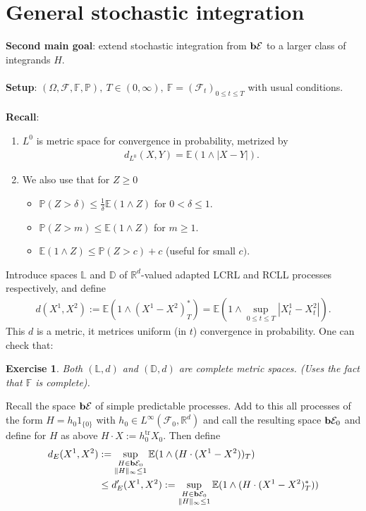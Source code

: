 \documentclass[12pt,a4paper, twoside]{article}
\newtheorem{exe}{Exercise}[section]
\theoremstyle{definition}
\newcommand{\EE}{\mathbb{E}} %
\newcommand{\PP}{\mathbb{P}} %
\newcommand{\simple}{\textbf{\text{b}}\mathcal{E}}
\begin{document}
\section{General stochastic integration}
\textbf{Second main goal}: extend stochastic integration from $\simple$ to a larger class of integrands $H$. 
\\\\
\textbf{Setup}: $( \Omega, \mathcal{F}, \mathbb{F}, \PP), \ T \in (0, \infty), \ \mathbb{F}= ( \mathcal{F}_t)_{0 \leq t \leq T}$ with usual conditions. 
\\
\\
\textbf{Recall}: \
 \begin{enumerate}
\item $L^0$ is metric space for convergence in probability, metrized by 
\begin{align*}
d_{L^0} (X,Y) = \EE(1 \wedge |X-Y|).
\end{align*}
\item We also use that for $Z \geq 0 $ 
\begin{itemize}
\item $\PP(Z > \delta) \leq \frac{1}{\delta} \EE(1 \wedge Z)$ for $0 < \delta \leq 1$.
\item $\PP(Z > m ) \leq \EE(1 \wedge Z)$ for $m \geq 1$. 
\item $\EE(1 \wedge Z) \leq \PP(Z>c) + c$ (useful for small $c)$. 
\end{itemize}
\end{enumerate}
Introduce spaces $\mathbb{L}$ and $\mathbb{D}$ of $\mathbb{R}^d$-valued adapted LCRL and RCLL processes respectively, and define
\begin{align*}
d(X^1, X^2):= \EE( 1 \wedge (X^1-X^2)_T^*) = \EE(1 \wedge \sup_{0 \leq t \leq T} |X_t^1-X_t^2|).
\end{align*}
This $d$ is a metric, it metrices uniform (in $t$) convergence in probability. One can check that:
\begin{exe} \label{ex5} Both $(\mathbb{L},d)$ and $( \mathbb{D},d)$ are complete metric spaces. (Uses the fact that $\mathbb{F}$ is complete). 
\end{exe}
Recall the space $\simple$ of simple predictable processes. Add to this all processes of the form $H=h_0 1_{\{0\}}$ with $h_0 \in L^\infty  ( \mathcal{F}_0, \mathbb{R}^d)$ and call the resulting space $\simple_0$ and define for $H$ as above $H \cdot X := h_0^\text{tr}X_0.$ Then define 
\begin{align*}
d_E(X^1,X^2)&:= \sup_{\substack{ H \in \simple_0 \\ \|H\|_\infty \leq 1}} \EE(1 \wedge ( H \cdot (X^1-X^2))_T) \\
&\leq d_E' (X^1,X^2):= \sup_{\substack{ H \in \simple_0  \\ \|H\|_\infty \leq 1}} \EE(1 \wedge (H \cdot (X^1-X^2)_T^*))
\end{align*}
\end{document}

